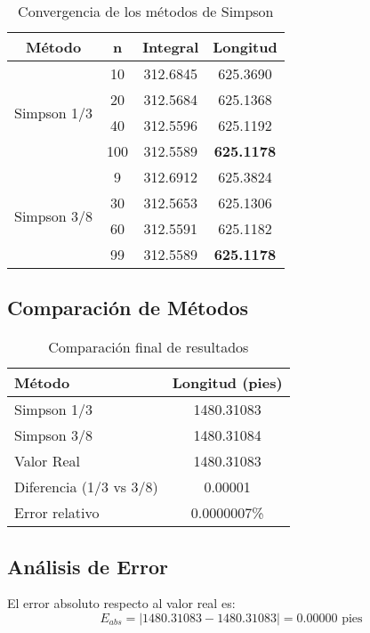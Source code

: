 \documentclass[conference]{IEEEtran}
\begin{document}
\begin{table}[H]
\centering
\caption{Convergencia de los métodos de Simpson}
\small
\begin{tabular}{|c|c|c|c|}
\hline
\textbf{Método} & \textbf{n} & \textbf{Integral} & \textbf{Longitud} \\
\hline
\multirow{4}{*}{Simpson 1/3} 
& 10 & 312.6845 & 625.3690 \\
& 20 & 312.5684 & 625.1368 \\
& 40 & 312.5596 & 625.1192 \\
& 100 & 312.5589 & \textbf{625.1178} \\
\hline
\multirow{4}{*}{Simpson 3/8} 
& 9 & 312.6912 & 625.3824 \\
& 30 & 312.5653 & 625.1306 \\
& 60 & 312.5591 & 625.1182 \\
& 99 & 312.5589 & \textbf{625.1178} \\
\hline
\end{tabular}
\end{table}

\subsection{Comparación de Métodos}

\begin{table}[H]
\centering
\caption{Comparación final de resultados}
\begin{tabular}{|l|c|}
\hline
\textbf{Método} & \textbf{Longitud (pies)} \\
\hline
Simpson 1/3 & 1480.31083 \\
Simpson 3/8 & 1480.31084 \\
Valor Real & 1480.31083 \\
\hline
Diferencia (1/3 vs 3/8) & 0.00001 \\
Error relativo & 0.0000007\% \\
\hline
\end{tabular}
\end{table}

\subsection{Análisis de Error}

El error absoluto respecto al valor real es:
\begin{equation}
E_{abs} = |1480.31083 - 1480.31083| = 0.00000 \text{ pies}
\end{equation}
\end{document}
